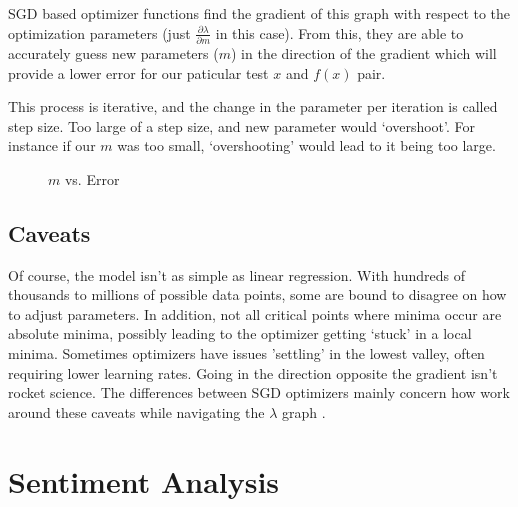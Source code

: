 \documentclass[titlepage,letterpaper]{article}
\begin{document}
SGD based optimizer functions find the gradient of this graph with respect to the optimization parameters (just $\frac{\partial\lambda}{\partial m}$ in this case). From this, they are able to accurately guess new parameters ($m$) in the direction of the gradient which will provide a lower error for our paticular test \(x\) and \(f(x)\) pair. 

This process is iterative, and the change in the parameter per iteration is called step size. Too large of a step size, and new parameter would `overshoot'. For instance if our $m$ was too small, `overshooting' would lead to it being too large.


\begin{figure}
	\vspace*{-.8in}
	\centering
\caption{ \(m\) vs. Error}
\label{fig:m_vs_error}
\def\svgwidth{1.5 in}

\end{figure}

\subsection{Caveats}
Of course, the model isn't as simple as linear regression. With hundreds of thousands to millions of possible data points, some are bound to disagree on how to adjust parameters. In addition, not all critical points where minima occur are absolute minima, possibly leading to the optimizer  getting `stuck' in a local minima. Sometimes optimizers have issues 'settling' in the lowest valley, often requiring lower learning rates.\cite{adaprop} Going in the direction opposite the gradient isn't rocket science. The differences between SGD optimizers mainly concern how work around these caveats while navigating the $\lambda$ graph \cite{adaprop,adam,rmsprop,moment}.

\section{Sentiment Analysis}
\end{document}

